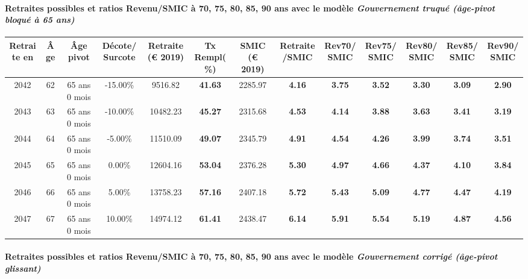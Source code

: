 \paragraph{Retraites possibles et ratios Revenu/SMIC à 70, 75, 80, 85, 90 ans avec le modèle \emph{Gouvernement truqué (âge-pivot bloqué à 65 ans)}}  
 
{ \scriptsize \begin{center} 
\begin{tabular}[htb]{|c|c||c|c||c|c||c||c|c|c|c|c|c|} 
\hline 
 Retraite en &  Âge &  Âge pivot &  Décote/Surcote &  Retraite (\euro{} 2019) &  Tx Rempl(\%) &  SMIC (\euro{} 2019) &  Retraite/SMIC &  Rev70/SMIC &  Rev75/SMIC &  Rev80/SMIC &  Rev85/SMIC &  Rev90/SMIC \\ 
\hline \hline 
 2042 &  62 &  65 ans 0 mois &  -15.00\% &  9516.82 &  {\bf 41.63} &  2285.97 &  {\bf 4.16} &  {\bf 3.75} &  {\bf 3.52} &  {\bf 3.30} &  {\bf 3.09} &  {\bf 2.90} \\ 
\hline 
 2043 &  63 &  65 ans 0 mois &  -10.00\% &  10482.23 &  {\bf 45.27} &  2315.68 &  {\bf 4.53} &  {\bf 4.14} &  {\bf 3.88} &  {\bf 3.63} &  {\bf 3.41} &  {\bf 3.19} \\ 
\hline 
 2044 &  64 &  65 ans 0 mois &  -5.00\% &  11510.09 &  {\bf 49.07} &  2345.79 &  {\bf 4.91} &  {\bf 4.54} &  {\bf 4.26} &  {\bf 3.99} &  {\bf 3.74} &  {\bf 3.51} \\ 
\hline 
 2045 &  65 &  65 ans 0 mois &  0.00\% &  12604.16 &  {\bf 53.04} &  2376.28 &  {\bf 5.30} &  {\bf 4.97} &  {\bf 4.66} &  {\bf 4.37} &  {\bf 4.10} &  {\bf 3.84} \\ 
\hline 
 2046 &  66 &  65 ans 0 mois &  5.00\% &  13758.23 &  {\bf 57.16} &  2407.18 &  {\bf 5.72} &  {\bf 5.43} &  {\bf 5.09} &  {\bf 4.77} &  {\bf 4.47} &  {\bf 4.19} \\ 
\hline 
 2047 &  67 &  65 ans 0 mois &  10.00\% &  14974.12 &  {\bf 61.41} &  2438.47 &  {\bf 6.14} &  {\bf 5.91} &  {\bf 5.54} &  {\bf 5.19} &  {\bf 4.87} &  {\bf 4.56} \\ 
\hline 
\hline 
\end{tabular} 
\end{center} } 
\paragraph{Retraites possibles et ratios Revenu/SMIC à 70, 75, 80, 85, 90 ans avec le modèle \emph{Gouvernement corrigé (âge-pivot glissant)}}  
 
